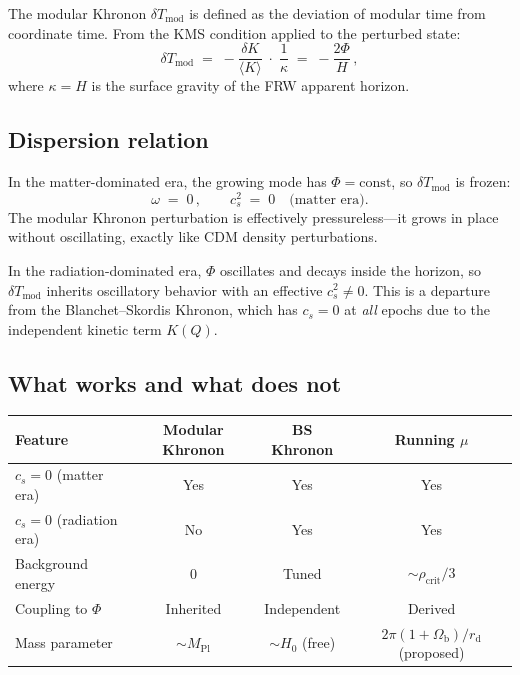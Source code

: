 \documentclass[prd,twocolumn,superscriptaddress,longbibliography,floatfix]{revtex4-2}
\newcommand{\Tmod}{T_{\mathrm{mod}}}
\begin{document}
The modular Khronon $\delta\Tmod$ is defined as the
deviation of modular time from coordinate time.  From the
KMS condition applied to the perturbed state:
\begin{equation}
\delta\Tmod \;=\; -\frac{\delta K}{\langle K\rangle}
\;\cdot\; \frac{1}{\kappa}
\;=\; -\frac{2\Phi}{H}\,,
\label{eq:delta_Tmod}
\end{equation}
where $\kappa = H$ is the surface gravity of the FRW
apparent horizon.

\subsection{Dispersion relation}

In the matter-dominated era, the growing mode has
$\Phi = \mathrm{const}$, so $\delta\Tmod$ is frozen:
\begin{equation}
\omega \;=\; 0\,,\qquad c_s^2 \;=\; 0
\quad\text{(matter era).}
\label{eq:dispersion_matter}
\end{equation}
The modular Khronon perturbation is effectively
pressureless---it grows in place without oscillating,
exactly like CDM density perturbations.

In the radiation-dominated era, $\Phi$ oscillates and
decays inside the horizon, so $\delta\Tmod$ inherits
oscillatory behavior with an effective
$c_s^2 \neq 0$.  This is a departure from the
Blanchet--Skordis Khronon, which has $c_s = 0$ at
\emph{all} epochs due to the independent kinetic term
$K(Q)$.

\subsection{What works and what does not}

\begin{center}
\begin{tabular}{lccc}
\textbf{Feature} &
\textbf{Modular Khronon} &
\textbf{BS Khronon} &
\textbf{Running $\mu$} \\
\hline
$c_s = 0$ (matter era) & Yes & Yes & Yes \\
$c_s = 0$ (radiation era) & No & Yes & Yes \\
Background energy & 0 & Tuned & $\sim\!\rho_{\mathrm{crit}}/3$ \\
Coupling to $\Phi$ & Inherited & Independent & Derived \\
Mass parameter & $\sim M_{\mathrm{Pl}}$ & $\sim H_0$ (free) & $2\pi(1\!+\!\Omega_{\mathrm{b}})/r_{\mathrm{d}}$ (proposed) \\
\end{tabular}
\end{center}
\end{document}
